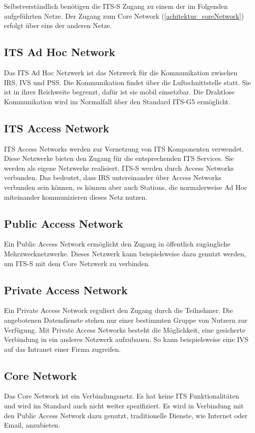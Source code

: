 Selbstverständlich benötigen die \ac{ITS-S} Zugang zu einem der im Folgenden aufgeführten Netze. Der Zugang zum Core Network (\autoref{achitektur_coreNetwork}) erfolgt über eins der anderen Netze. 

\subsection{ITS Ad Hoc Network\label{achitektur_adHocNetwork}}
Das \ac{ITS} Ad Hoc Netzwerk ist das Netzwerk für die Kommunikation zwischen \ac{IRS}, \ac{IVS} und \ac{PSS}. Die Kommunikation findet über die Luftschnittstelle statt. Sie ist in ihrer Reichweite begrenzt, dafür ist sie mobil einsetzbar. Die Drahtlose Kommunikation wird im Normalfall über den Standard ITS-G5 ermöglicht.


\subsection{ITS Access Network \label{architektur_itsAccessNetwork}}
ITS Access Networks werden zur Vernetzung von \ac{ITS} Komponenten verwendet. Diese Netzwerke bieten den Zugang für die entsprechenden \ac{ITS} Services. Sie werden als eigene Netzwerke realisiert. \ac{ITS-S} werden durch Access Networks verbunden. Das bedeutet, dass \ac{IRS} untereinander über Access Networks verbunden sein können, es können aber auch Stations, die normalerweise Ad Hoc miteinander kommunizieren dieses Netz nutzen. 

\subsection{Public Access Network}
Ein Public Access Network ermöglicht den Zugang in öffentlich zugängliche Mehrzwecknetzwerke. Dieses Netzwerk kann beispielsweise dazu genutzt werden, um \ac{ITS-S} mit dem Core Netzwerk zu verbinden. 

\subsection{Private Access Network}
Ein Private Access Network reguliert den Zugang durch die Teilnehmer. Die angebotenen Datendienste stehen nur einer bestimmten Gruppe von Nutzern zur Verfügung. Mit Private Access Networks besteht die Möglichkeit, eine gesicherte Verbindung in ein anderes Netzwerk aufzubauen. So kann beispielsweise eine \ac{IVS} auf das Intranet einer Firma zugreifen. 

\subsection{Core Network \label{achitektur_coreNetwork}}
Das Core Network ist ein Verbindungsnetz. Es hat keine \ac{ITS} Funktionalitäten und wird im Standard auch nicht weiter spezifiziert. Es wird in Verbindung mit den Public Access Network dazu genutzt, traditionelle Dienste, wie Internet oder Email, anzubieten.
 
